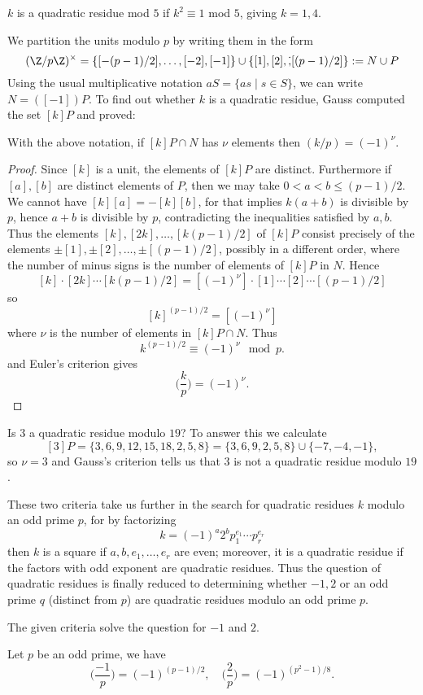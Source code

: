\begin{example}
$k$ is a quadratic residue mod $5$ if $k^2\equiv1$ mod $5$, giving $k=1,4$.
\end{example}
We partition the units modulo $p$ by writing them in the form
\[(\Z/p\Z)^\times=\{[-(p-1)/2],\dots,[-2],[-1]\}\cup\{[1],[2],\dot,[(p-1)/2]\}:=N\cup P\]
Using the usual multiplicative notation $aS=\{as\mid s\in S\}$, we can write $N=([-1])P$. To find out whether $k$ is a quadratic residue, Gauss computed
the set $[k]P$ and proved:
\begin{proposition}
With the above notation, if $[k]P\cap N$ has $\nu$ elements then $(k/p)=(-1)^\nu$.
\end{proposition}
\begin{proof}
Since $[k]$ is a unit, the elements of  $[k]P$ are distinct. Furthermore if $[a],[b]$ are distinct elements of $P$, then we may take $0<a<b\leq(p-1)/2$. We cannot have $[k][a]=-[k][b]$, for that implies $k(a+b)$ is divisible by $p$, hence $a+b$ is divisible by $p$, contradicting the inequalities satisfied by $a,b$. Thus the elements $[k],[2k],\dots,[k(p-1)/2]$ of $[k]P$ consist precisely of the elements $\pm[1],\pm[2],\dots,\pm[(p-1)/2]$, possibly in a different order, where the number of minus signs is the number of elements of $[k]P$ in $N$. Hence
\[[k]\cdot[2k]\cdots[k(p-1)/2]=[(-1)^\nu]\cdot[1]\cdots[2]\cdots[(p-1)/2]\]
so
\[[k]^{(p-1)/2}=[(-1)^\nu]\]
where $\nu$ is the number of elements in $[k]P\cap N$. Thus
\[k^{(p-1)/2}\equiv(-1)^\nu\mod p.\]
and Euler's criterion gives
\[\Big(\frac{k}{p}\Big)=(-1)^\nu.\]
\end{proof}
\begin{example}
Is $3$ a quadratic residue modulo $19$? To answer this we calculate
\[[3]P=\{3,6,9,12,15,18,2,5,8\}=\{3,6,9,2,5,8\}\cup\{-7,-4,-1\},\]
so $\nu=3$ and Gauss's criterion tells us that $3$ is not a quadratic residue modulo $19$.
\end{example}
These two criteria take us further in the search for quadratic residues $k$ modulo an odd prime $p$, for by factorizing
\[k=(-1)^a2^bp_1^{e_1}\cdots p_r^{e_r}\]
then $k$ is a square if $a,b,e_1,\dots,e_r$ are even; moreover, it is a quadratic residue if the factors with odd exponent are quadratic residues. Thus the question of quadratic residues is finally reduced to determining whether $-1,2$ or an odd prime $q$ (distinct from $p$) are quadratic residues modulo an odd prime $p$.\par
The given criteria solve the question for $-1$ and $2$.
\begin{proposition}
Let $p$ be an odd prime, we have
\[\Big(\frac{-1}{p}\Big)=(-1)^{(p-1)/2},\quad \Big(\frac{2}{p}\Big)=(-1)^{(p^2-1)/8}.\]
\end{proposition}
